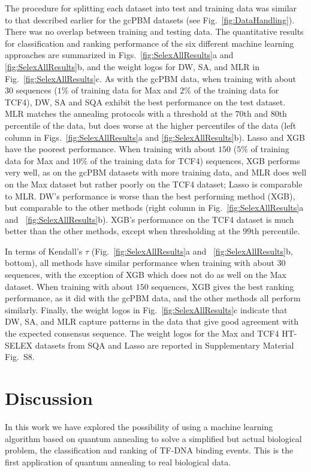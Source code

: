 \documentclass[aps,pra,groupedaddress,nofootinbib,notitlepage,showpacs,floatfix,superscriptaddress]{revtex4-1}
\begin{document}
The {procedure for} splitting each dataset into test and training data was similar to that described earlier for the gcPBM datasets (see Fig.~\ref{fig:DataHandling}). There was no overlap between training and testing data. The quantitative results for classification and ranking performance of the six different machine learning approaches are summarized in Figs.~\ref{fig:SelexAllResults}a and \ref{fig:SelexAllResults}b, and the weight logos for DW, SA, and MLR in Fig.~\ref{fig:SelexAllResults}c. As with the gcPBM data, when training with about $30$ sequences ($1\%$ of training data for Max and $2\%$ of the training data for TCF4), DW, SA and SQA exhibit the best performance on the test dataset. MLR matches the annealing protocols with a threshold at the $70$th and $80$th percentile of the data, but does worse at the higher percentiles of the data (left column in Figs.~\ref{fig:SelexAllResults}a and \ref{fig:SelexAllResults}b). Lasso and XGB have the poorest performance. When training with about $150$ ($5\%$ of training data for Max and $10\%$ of the training data for TCF4) sequences, XGB performs very well, as on the gcPBM datasets with more training data, and MLR does well on the Max dataset but rather poorly on the TCF4 dataset; Lasso is comparable to MLR. DW's performance is worse than the best performing method (XGB), but comparable to the other methods (right column in Fig.~\ref{fig:SelexAllResults}a and ~\ref{fig:SelexAllResults}b). XGB's performance on the TCF4 dataset is much better than the other methods, except when thresholding at the $99$th percentile. 

In terms of Kendall's  $\tau$ (Fig.~\ref{fig:SelexAllResults}a and ~\ref{fig:SelexAllResults}b, bottom), all methods have similar performance when training with about $30$ sequences, with the exception of XGB which does not do as well on the Max dataset. When training with about $150$ sequences, XGB gives the best ranking performance, as it did with the gcPBM data, and the other methods all perform similarly. Finally, the weight logos in Fig.~\ref{fig:SelexAllResults}c indicate that DW, SA, and MLR capture patterns in the data that give good agreement with the expected consensus sequence. The weight logos for the Max and TCF4 HT-SELEX datasets from SQA and Lasso are reported in Supplementary Material Fig.~S8.


\section*{Discussion}
In this work we have explored the possibility of using a machine learning algorithm based on quantum annealing to solve a simplified but actual biological problem, the classification and ranking of TF-DNA binding events. This is the first application of quantum annealing to real biological data.
\end{document}
